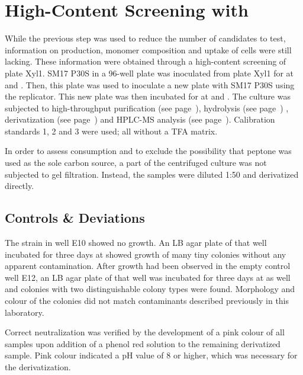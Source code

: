 \section{High-Content Screening with \XYL{}\label{sec-xyl-hcs}}
While the previous step was used to reduce the number of candidates to test, information on \eps{} production, \eps{} monomer composition and \xyl{} uptake of cells were still lacking. These information were obtained through a high-content screening of plate Xyl1.
 SM17 P30S in a 96-well plate was inoculated from plate Xyl1 for  at  and . Then, this plate was used to inoculate a new plate with  SM17 P30S using the replicator. This new plate was then incubated for  at  and .
The culture was subjected to high-throughput \eps{} purification (see page~\pageref{hteps-purification}), hydrolysis (see page~\pageref{pmp-hydrolysis})%
, derivatization (see page~\pageref{pmp-deriv}) and HPLC-MS analysis (see page~\pageref{pmp-hplc-ms}). Calibration standards 1, 2 and 3 were used; all without a TFA matrix.

In order to assess \xyl{} consumption and to exclude the possibility that peptone was used as the sole carbon source, a part of the centrifuged culture was not subjected to gel filtration. Instead, the samples were diluted 1:50 and derivatized directly.

\subsection{Controls \& Deviations}
The strain in well E10 showed no growth. An LB agar plate of that well incubated for three days at  showed growth of many tiny colonies without any apparent contamination. After growth had been observed in the empty control well E12, an LB agar plate of that well was incubated for three days at  as well and colonies with two distinguishable colony types were found. Morphology and colour of the colonies did not match contaminants described previously in this laboratory.

Correct neutralization was verified by the development of a pink colour of all samples upon addition of a phenol red solution to the remaining derivatized sample. Pink colour indicated a pH value of 8 or higher, which was necessary for the derivatization.

